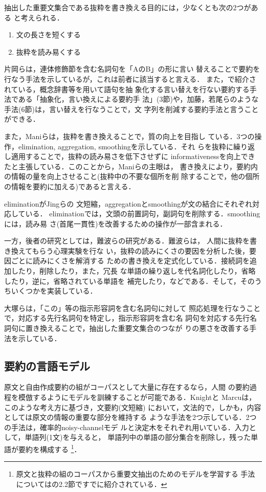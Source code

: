 抽出した重要文集合である抜粋を書き換える目的には，少なくとも次の2つがある
と考えられる．
\begin{enumerate}
 \item 文の長さを短くする
 \item 抜粋を読み易くする
\end{enumerate}

片岡ら\cite{kataoka:99:a}は，連体修飾節を含む名詞句を「AのB」の形に言い
替えることで要約を行なう手法を示しているが，これは前者に該当すると言える．
また，\cite{okumura:99:a}で紹介されている，概念辞書等を用いて語句を抽
象化する言い替えを行ない要約する手法である「抽象化，言い換えによる要約手
法」(3節)や，加藤，若尾らのような手法(6節)は，言い替えを行なうことで，文
字列を削減する要約手法と言うことができる．

また，Maniら\cite{mani:99:b}は，抜粋を書き換えることで，質の向上を目指し
ている．3つの操作，elimination, aggregation, smoothingを示している．それ
らを抜粋に繰り返し適用することで，抜粋の読み易さを低下させずに
informativenessを向上できたと主張している．このことから，Maniらの主眼は，
書き換えにより，要約内の情報の量を向上させること(抜粋中の不要な個所を削
除することで，他の個所の情報を要約に加える)であると言える．

eliminationがJingらの
文短縮，aggregationとsmoothingが文の結合にそれぞれ対応している．
eliminationでは，文頭の前置詞句，副詞句を削除する．smoothingには，読み易
さ(首尾一貫性)を改善するための操作が一部含まれる．

一方，後者の研究としては，難波ら\cite{nanba:99:b}の研究がある．難波らは，
人間に抜粋を書き換えてもらう心理実験を行な
い，抜粋の読みにくさの要因を分析した後，要因ごとに読みにくさを解消する
ための書き換えを定式化している．接続詞を追加したり，削除したり，また，冗長
な単語の繰り返しを代名詞化したり，省略したり，逆に，省略されている単語を
補完したり，などである．そして，そのうちいくつかを実装している．

大塚ら\cite{otsuka:01:a}は，「この」等の指示形容詞を含む名詞句に対して
照応処理を行なうことで，対応する先行名詞句を特定し，指示形容詞を含む名
詞句を対応する先行名詞句に置き換えることで，抽出した重要文集合のつなが
りの悪さを改善する手法を示している．

\subsection{要約の言語モデル}

原文と自由作成要約の組がコーパスとして大量に存在するなら，人間
の要約過程を模倣するようにモデルを訓練することが可能である．Knightと
Marcu\cite{knight:00:a}は，このような考え方に基づき，文要約(文短縮)
において，文法的で，しかも，内容としては原文の情報の重要な部分を維持する
ような手法を2つ示している．2つの手法は，確率的noisy-channelモデ
ルと決定木をそれぞれ用いている．入力として，単語列(1文)を与えると，
単語列中の単語の部分集合を削除し，残った単語が要約を構成する
\footnote{原文と抜粋の組のコーパスから重要文抽出のためのモデルを学習する
手法については\cite{okumura:99:a}の2.2節ですでに紹介されている．}．

